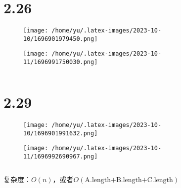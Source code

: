 \documentclass[14pt]{extarticle}
\begin{document}
\inputminted{cpp}{2.22.cpp}



\section{2.26}
\begin{figure}[H]
    \centering
    \texttt{[image: /home/yu/.latex-images/2023-10-10/1696901979450.png]}
\end{figure}
\begin{figure}[H]
    \centering
    \texttt{[image: /home/yu/.latex-images/2023-10-11/1696991750030.png]}
\end{figure}

\inputminted{cpp}{2.26.cpp}



\section{2.29}
\begin{figure}[H]
    \centering
    \texttt{[image: /home/yu/.latex-images/2023-10-10/1696901991632.png]}
\end{figure}
\begin{figure}[H]
    \centering
    \texttt{[image: /home/yu/.latex-images/2023-10-11/1696992690967.png]}
\end{figure}

\inputminted{cpp}{2.29.cpp}

复杂度：$O(n)$，或者$O(\text{A.length+B.length+C.length})$
\end{document}
